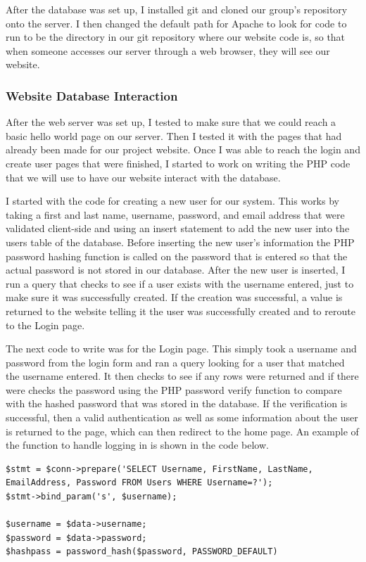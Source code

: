 \documentclass[onecolumn, draftclsnofoot,10pt, compsoc]{IEEEtran}
\begin{document}
After the database was set up, I installed git and cloned our group's repository onto the server. I then changed the default path for Apache to look for code to run to be the directory in our git repository where our website code is, so that when someone accesses our server through a web browser, they will see our website.

\subsubsection{Website Database Interaction}
After the web server was set up, I tested to make sure that we could reach a basic hello world page on our server. Then I tested it with the pages that had already been made for our project website. Once I was able to reach the login and create user pages that were finished, I started to work on writing the PHP code that we will use to have our website interact with the database.

I started with the code for creating a new user for our system. This works by taking a first and last name, username, password, and email address that were validated client-side and using an insert statement to add the new user into the users table of the database. Before inserting the new user's information the PHP password hashing function is called on the password that is entered so that the actual password is not stored in our database. After the new user is inserted, I run a query that checks to see if a user exists with the username entered, just to make sure it was successfully created. If the creation was successful, a value is returned to the website telling it the user was successfully created and to reroute to the Login page.

The next code to write was for the Login page. This simply took a username and password from the login form and ran a query looking for a user that matched the username entered. It then checks to see if any rows were returned and if there were checks the password using the PHP password verify function to compare with the hashed password that was stored in the database. If the verification is successful, then a valid authentication as well as some information about the user is returned to the page, which can then redirect to the home page. An example of the function to handle logging in is shown in the code below.

\begin{lstlisting}
$stmt = $conn->prepare('SELECT Username, FirstName, LastName, EmailAddress, Password FROM Users WHERE Username=?');
$stmt->bind_param('s', $username); 
	
$username = $data->username;
$password = $data->password;
$hashpass = password_hash($password, PASSWORD_DEFAULT)

\end{lstlisting}
\end{document}
